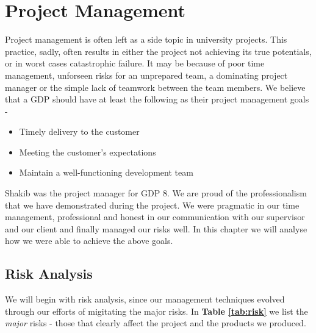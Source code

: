\chapter{Project Management}
\label{chap:project-management}

Project management is often left as a side topic in university projects. This practice, sadly, often results in either the project not achieving its true potentials, or in worst cases catastrophic failure. It may be because of poor time management, unforseen risks for an unprepared team, a dominating project manager or the simple lack of teamwork between the team members. We believe that a GDP should have at least the following as their project management goals \cite{iansommerville2011} -

\begin{itemize}

  \item Timely delivery to the customer
  \item Meeting the customer's expectations
  \item Maintain a well-functioning development team

\end{itemize}

Shakib was the project manager for GDP 8. We are proud of the professionalism that we have demonstrated during the project. We were pragmatic in our time management, professional and honest in our communication with our supervisor and our client and finally managed our risks well. In this chapter we will analyse how we were able to achieve the above goals.

\section{Risk Analysis}
\label{sec:risk-analysis}

We will begin with risk analysis, since our management techniques evolved through our efforts of migitating the major risks. In \textbf{Table \ref{tab:risk}} we list the \textit{major} risks - those that clearly affect the project and the products we produced.

\pagebreak

